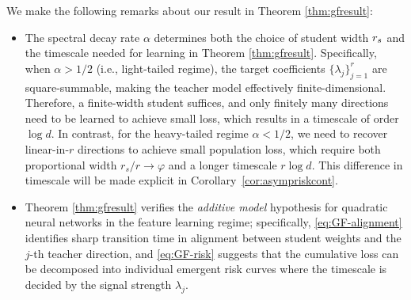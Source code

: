 \begin{remark}
We make the following remarks about our result in Theorem \ref{thm:gfresult}:
\begin{itemize}[leftmargin=*]
\item  The spectral decay rate $\alpha$ determines both the choice of student width $r_s$ and the timescale needed for learning in Theorem \ref{thm:gfresult}. Specifically, when $\alpha > 1/2$ (i.e., light-tailed regime), the target coefficients $\{ \lambda_j \}_{j = 1}^r$ are square-summable, making the teacher model effectively finite-dimensional. Therefore, a finite-width student suffices, and only finitely many directions need to be learned to achieve small loss, which results in a timescale of order $\log d$. In contrast, for the heavy-tailed regime $\alpha < 1/2$, we need to recover linear-in-$r$ directions to achieve small population loss, which require both proportional width $r_s / r \to \varphi$ and a longer timescale $r \log d$. 
This difference in timescale will be made explicit in Corollary~\ref{cor:asympriskcont}. 
\item Theorem \ref{thm:gfresult} verifies the \textit{additive model} hypothesis \cite{michaud2024quantization} for quadratic neural networks in the feature learning regime; specifically, \eqref{eq:GF-alignment} identifies sharp transition time in alignment between student weights and the $j$-th teacher direction, and \eqref{eq:GF-risk} suggests that the cumulative loss can be decomposed into individual emergent risk curves where the timescale is decided by the signal strength $\lambda_j$. 
\end{itemize}

\end{remark}



